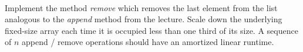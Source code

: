  \\
Implement the method \textit{remove} which removes the last element from the
list analogous to the \textit{append} method from the lecture.
Scale down the underlying fixed-size array each time it is occupied less than
one third of its size.
A sequence of $n$ append / remove operations should have an amortized linear
runtime.
